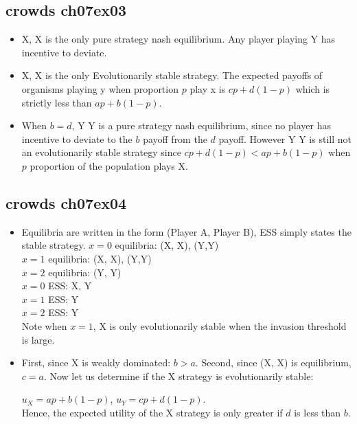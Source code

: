 \documentclass{article}
\begin{document}
\subsection{crowds ch07ex03}
\begin{itemize}
	\item X, X is the only pure strategy nash equilibrium.
			Any player playing Y has incentive to deviate.
	\item X, X is the only Evolutionarily stable strategy.
			The expected payoffs of organisms playing y when proportion $p$ play x is $cp + d(1-p)$ which is strictly less than $ap + b(1-p)$.
	\item When $b=d$, Y Y is a pure strategy nash equilibrium, since no player has incentive to deviate to the $b$ payoff from the $d$ payoff.
			However Y Y is still not an evolutionarily stable strategy since $cp + d(1-p) < ap + b(1-p)$ when $p$ proportion of the population plays X.
\end{itemize}

\subsection{crowds ch07ex04}
\begin{itemize}
	\item Equilibria are written in the form (Player A, Player B), ESS simply states the stable strategy.
			$x=0$ equilibria: (X, X), (Y,Y)\\
			$x=1$ equilibria: (X, X), (Y,Y)\\
			$x=2$ equilibria: (Y, Y)\\
			$x=0$ ESS: X, Y\\
			$x=1$ ESS: Y\\
			$x=2$ ESS: Y\\
		Note when $x=1$, X is only evolutionarily stable when the invasion threshold is large.
	\item First, since X is weakly dominated: $b > a$.
			Second, since (X, X) is equilibrium, $c = a$.
			Now let us determine if the X strategy is evolutionarily stable:
			
			$u_X = ap + b(1-p)$, $u_Y = cp + d(1-p)$. \\
			Hence, the expected utility of the X strategy is only greater if $d$ is less than $b$.
\end{itemize}
\end{document}
